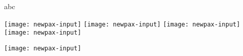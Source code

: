 \documentclass{article}
\begin{document}
abc

\texttt{[image: newpax-input]}
\texttt{[image: newpax-input]}
%
\texttt{[image: newpax-input]}
\texttt{[image: newpax-input]}

\texttt{[image: newpax-input]}

%
\end{document}

